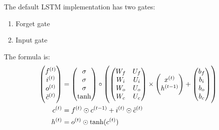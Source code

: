 \begin{definition}
The default LSTM implementation has two gates:
\begin{enumerate}
    \item Forget gate
    \item Input gate
\end{enumerate}

The formula is:
\begin{equation}
    \begin{aligned}
        \begin{pmatrix}
            \selectonesample{f}{t} \\
            \selectonesample{i}{t} \\
            \selectonesample{o}{t} \\
            \selectonesample{\tilde{c}}{t}
        \end{pmatrix} &= \begin{pmatrix}
            \sigma \\
            \sigma \\
            \sigma \\
            \tanh
        \end{pmatrix} \circ \mleft( \begin{pmatrix}
            W_f & U_f \\
            W_i & U_i \\
            W_o & U_o \\
            W_c & U_c
        \end{pmatrix} \times \begin{pmatrix}
            \selectonesample{x}{t} \\
            \selectonesample{h}{t-1}
        \end{pmatrix} + \begin{pmatrix}
            b_f \\
            b_i \\
            b_o \\
            b_c
        \end{pmatrix} \mright) \\
        \selectonesample{c}{t} &= \selectonesample{f}{t} \odot \selectonesample{c}{t-1} + \selectonesample{i}{t} \odot \selectonesample{\tilde{c}}{t} \\
        \selectonesample{h}{t} &= \selectonesample{o}{t} \odot \tanh(\selectonesample{c}{t})
    \end{aligned}
\end{equation}


\end{definition}
